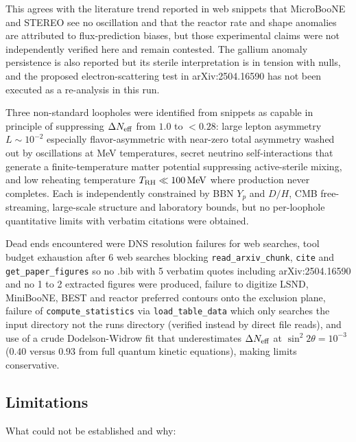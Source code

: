 \documentclass[11pt,a4paper]{article}
\begin{document}
This agrees with the literature trend reported in web snippets that MicroBooNE and STEREO see no oscillation and that the reactor rate and shape anomalies are attributed to flux-prediction biases, but those experimental claims were not independently verified here and remain contested. The gallium anomaly persistence is also reported but its sterile interpretation is in tension with nulls, and the proposed electron-scattering test in arXiv:2504.16590 has not been executed as a re-analysis in this run.

Three non-standard loopholes were identified from snippets as capable in principle of suppressing $\Delta N_{\rm eff}$ from $1.0$ to $<0.28$: large lepton asymmetry $L \sim 10^{-2}$ especially flavor-asymmetric with near-zero total asymmetry washed out by oscillations at MeV temperatures, secret neutrino self-interactions that generate a finite-temperature matter potential suppressing active-sterile mixing, and low reheating temperature $T_{\rm RH} \ll 100\,\mathrm{MeV}$ where production never completes. Each is independently constrained by BBN $Y_p$ and $D/H$, CMB free-streaming, large-scale structure and laboratory bounds, but no per-loophole quantitative limits with verbatim citations were obtained.

Dead ends encountered were DNS resolution failures for web searches, tool budget exhaustion after 6 web searches blocking \texttt{read\_\allowbreak{}arxiv\_\allowbreak{}chunk}, \texttt{cite} and \texttt{get\_\allowbreak{}paper\_\allowbreak{}figures} so no .bib with 5 verbatim quotes including arXiv:2504.16590 and no 1 to 2 extracted figures were produced, failure to digitize LSND, MiniBooNE, BEST and reactor preferred contours onto the exclusion plane, failure of \texttt{compute\_\allowbreak{}statistics} via \texttt{load\_\allowbreak{}table\_\allowbreak{}data} which only searches the input directory not the runs directory (verified instead by direct file reads), and use of a crude Dodelson-Widrow fit that underestimates $\Delta N_{\rm eff}$ at $\sin^2 2\theta = 10^{-3}$ ($0.40$ versus $0.93$ from full quantum kinetic equations), making limits conservative.

\subsection{Limitations}
What could not be established and why:
\end{document}
